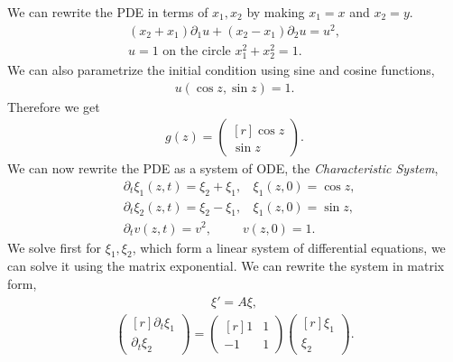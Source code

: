 \begin{questions}


\begin{solution}
We can rewrite the PDE in terms of $x_1,x_2$ by making $x_1=x$ and $x_2=y$.
\begin{align*}
(x_2+x_1)\partial_1u+(x_2-x_1)\partial_2u=u^2,\\
u=1\text{ on the circle }x_1^2+x_2^2=1.
\end{align*}
We can also parametrize the initial condition using sine and cosine functions,\begin{align*}
u(\cos{z},\sin{z})=1.
\end{align*}
Therefore we get
\begin{align*}
g(z)=\begin{pmatrix*}[r]
\cos{z}\\
\sin{z}
\end{pmatrix*}.
\end{align*}
We can now rewrite the PDE as a system of ODE, the \textit{Characteristic System},
\begin{align*}
&\partial_t\xi_1(z,t)=\xi_2+\xi_1,~~~~\xi_1(z,0)=\cos{z},\\
&\partial_t\xi_2(z,t)=\xi_2-\xi_1,~~~~\xi_1(z,0)=\sin{z},\\
&\partial_tv(z,t)=v^2,~~~~~~~~~~~v(z,0)=1.
\end{align*}
We solve first for $\xi_1,\xi_2$, which form a linear system of differential equations, we can solve it using the matrix exponential. We can rewrite the system in matrix form,
\begin{align*}
\xi'=A\xi,
\end{align*}
\begin{align*}
\begin{pmatrix*}[r]
\partial_t\xi_1\\
\partial_t\xi_2
\end{pmatrix*}=\begin{pmatrix*}[r]
1 & 1\\
-1 & 1
\end{pmatrix*}
\begin{pmatrix*}[r]
\xi_1\\
\xi_2
\end{pmatrix*}.

\end{align*}
\end{solution}
\end{questions}
